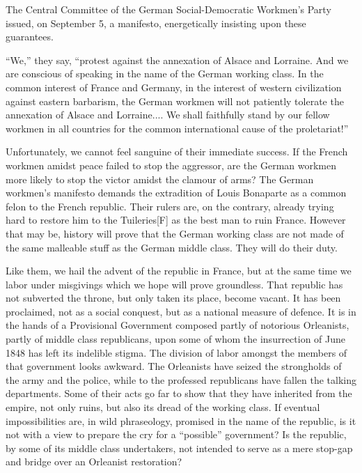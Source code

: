 \documentclass{article}
\begin{document}
The Central Committee of the German Social-Democratic Workmen’s Party
issued, on September 5, a manifesto, energetically insisting upon these
guarantees.

“We,” they say, “protest against the annexation of Alsace and Lorraine.
And we are conscious of speaking in the name of the German working class.
In the common interest of France and Germany, in the interest of western
civilization against eastern barbarism, the German workmen will not
patiently tolerate the annexation of Alsace and Lorraine.... We shall
faithfully stand by our fellow workmen in all countries for the common
international cause of the proletariat!”

Unfortunately, we cannot feel sanguine of their immediate success. If the
French workmen amidst peace failed to stop the aggressor, are the German
workmen more likely to stop the victor amidst the clamour of arms? The
German workmen’s manifesto demands the extradition of Louis Bonaparte as
a common felon to the French republic. Their rulers are, on the contrary,
already trying hard to restore him to the Tuileries[F] as the best man to
ruin France. However that may be, history will prove that the German
working class are not made of the same malleable stuff as the German
middle class. They will do their duty.

Like them, we hail the advent of the republic in France, but at the same
time we labor under misgivings which we hope will prove groundless. That
republic has not subverted the throne, but only taken its place, become
vacant. It has been proclaimed, not as a social conquest, but as
a national measure of defence. It is in the hands of a Provisional
Government composed partly of notorious Orleanists, partly of middle class
republicans, upon some of whom the insurrection of June 1848 has left its
indelible stigma. The division of labor amongst the members of that
government looks awkward. The Orleanists have seized the strongholds of
the army and the police, while to the professed republicans have fallen
the talking departments. Some of their acts go far to show that they have
inherited from the empire, not only ruins, but also its dread of the
working class. If eventual impossibilities are, in wild phraseology,
promised in the name of the republic, is it not with a view to prepare the
cry for a “possible” government? Is the republic, by some of its middle
class undertakers, not intended to serve as a mere stop-gap and bridge
over an Orleanist restoration?
\end{document}
